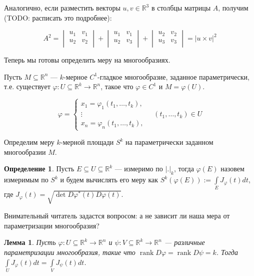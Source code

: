 \documentclass[a5paper]{article}
\newcounter{through}
\theoremstyle{plain}
\newtheorem{lemma}[through]{Лемма}
\theoremstyle{definition}
\newtheorem{definition}[through]{Определение}
\numberwithin{through}{section}
\numberwithin{equation}{section}
\DeclareMathOperator{\rank}{rank}
\begin{document}
Аналогично, если разместить векторы $u, v \in \mathbb{R}^3$ в столбцы матрицы $A$, получим (TODO: расписать это подробнее):

\begin{equation*}
	A^2 = 
	\begin{vmatrix}
		u_1 & v_1 \\
		u_2 & v_2 \\
	\end{vmatrix}
	+
	\begin{vmatrix}
	u_1 & v_1 \\
	u_2 & v_3 \\
	\end{vmatrix}
		+
	\begin{vmatrix}
	u_2 & v_2 \\
	u_3 & v_3 \\
	\end{vmatrix}
	= |u \times v|^2
\end{equation*}

Теперь мы готовы определить меру на многообразиях.

Пусть $M \subseteq \mathbb{R}^n$ --- $k$-мерное $C^1$-гладкое многообразие, заданное параметрически, т.е. существует $\varphi : U \subseteq \mathbb{R}^k \to \mathbb{R}^n$, такое что $\varphi \in C^1$ и $M=\varphi(U)$. 

\begin{equation*}
\varphi = 
\begin{cases}
	x_1 = \varphi_1(t_1, \ldots, t_k), \\
	\vdots \\
	x_n = \varphi_n(t_1, \ldots, t_k),
\end{cases}
\quad 
(t_1, \ldots, t_k) \in U
\end{equation*}

Определим меру $k$-мерной площади $S^k$ на параметрически заданном многообразии $M$.

\begin{definition} 
	\label{kDimSquare}
	Пусть $E \subseteq U \subseteq \mathbb{R}^k$ --- измеримо по $|.|_k$, тогда $\varphi(E)$ назовем измеримым по $S^k$ и будем вычислять его меру как $S^k(\varphi(E)) := \int\limits_{E} J_{\varphi}(t)dt$, где $J_{\varphi}(t)=\sqrt{\det D \varphi^*(t) D \varphi(t)}$.
\end{definition}

Внимательный читатель задастся вопросом: а не зависит ли наша мера от параметризации многообразия?

\begin{lemma}
	Пусть  $\varphi : U \subseteq \mathbb{R}^k \to \mathbb{R}^n$ и  $\psi : V \subseteq \mathbb{R}^k \to \mathbb{R}^n$ --- различные параметризации многообразия, такие что $\rank D \varphi = \rank D \psi = k$. Тогда $\int\limits_{U} J_{\varphi}(t)dt = \int\limits_{V} J_{\psi}(t)dt$.
\end{lemma}
\end{document}
